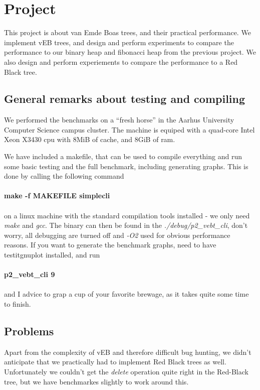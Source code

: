 \section*{Project}
This project is about van Emde Boas trees, and their practical performance. We implement vEB trees, and design and perform experiments to compare the performance to our binary heap and fibonacci heap from the previous project. We also design and perform experiements to compare the performance to a Red Black tree.

\subsection*{General remarks about testing and compiling}
We performed the benchmarks on a ``fresh horse'' in the Aarhus University Computer Science campus cluster. The machine is equiped with a quad-core Intel Xeon X3430 cpu with 8MiB of cache, and 8GiB of ram.

We have included a makefile, that can be used to compile everything and run some basic testing and the full benchmark, including generating graphs. This is done by calling the following command\\
\\
\textbf{make -f MAKEFILE simplecli}\\
\\
on a linux machine with the standard compilation tools installed - we only need \textit{make} and \textit{gcc}. The binary can then be found in the \textit{./debug/p2\_vebt\_cli}, don't worry, all debugging are turned off and \textit{-O2} used for obvious performance reasons. If you want to generate the benchmark graphs, need to have testit{gnuplot} installed, and run \\
\\
\textbf{p2\_vebt\_cli 9}\\
\\
and I advice to grap a cup of your favorite brewage, as it takes quite some time to finish.
\subsection*{Problems}
Apart from the complexity of vEB and therefore difficult bug hunting, we didn't anticipate that we practically had to implement Red Black trees as well. Unfortunately we couldn't get the \textit{delete} operation quite right in the Red-Black tree, but we have benchmarkes slightly to work around this.